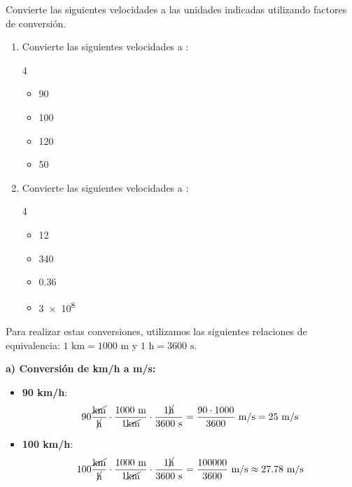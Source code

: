 \begin{exercise}
    Convierte las siguientes velocidades a las unidades indicadas utilizando factores de conversión.
    \begin{enumerate}[label=\letraminuscula]
        \item Convierte las siguientes velocidades a \unit{\mps}:
        \begin{multicols}{4}
            \begin{itemize}
                \item \qty{90}{\kmph}
                \item \qty{100}{\kmph}
                \item \qty{120}{\kmph}
                \item \qty{50}{\kmph}
            \end{itemize}
        \end{multicols}
        \item Convierte las siguientes velocidades a \unit{\kmph}:
        \begin{multicols}{4}
            \begin{itemize}
                \item \qty{12}{\mps}
                \item \qty{340}{\mps}
                \item \qty{0.36}{\mps}
                \item \qty{3e8}{\mps}
            \end{itemize}
        \end{multicols}
    \end{enumerate}
    \begin{solu}

        Para realizar estas conversiones, utilizamos las siguientes relaciones de equivalencia: $1 \text{ km} = 1000 \text{ m}$ y $1 \text{ h} = 3600 \text{ s}$.

        \textbf{a) Conversión de km/h a m/s:}
        \begin{itemize}
            \item \textbf{90 km/h}:
            \[ 90 \frac{\cancel{\text{km}}}{\cancel{\text{h}}} \cdot \frac{1000 \text{ m}}{1 \cancel{\text{km}}} \cdot \frac{1 \cancel{\text{h}}}{3600 \text{ s}} = \frac{90 \cdot 1000}{3600} \text{ m/s} = 25 \text{ m/s} \]

            \item \textbf{100 km/h}:
            \[ 100 \frac{\cancel{\text{km}}}{\cancel{\text{h}}} \cdot \frac{1000 \text{ m}}{1 \cancel{\text{km}}} \cdot \frac{1 \cancel{\text{h}}}{3600 \text{ s}} = \frac{100000}{3600} \text{ m/s} \approx 27.78 \text{ m/s} \]


\end{itemize}
\end{solu}
\end{exercise}
